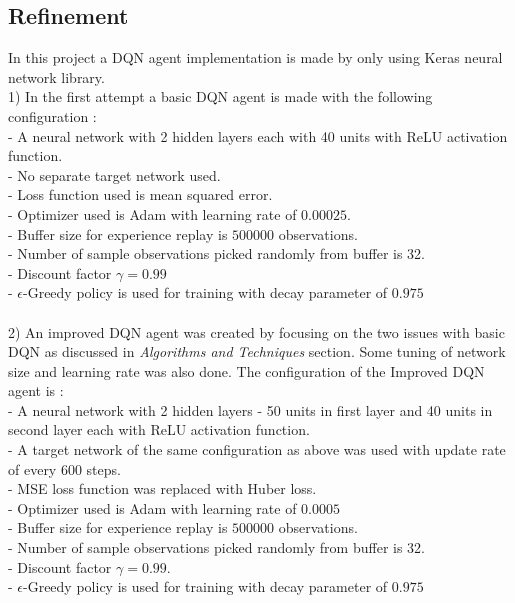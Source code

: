\documentclass{article}
\begin{document}
\subsection*{Refinement}
In this project a DQN agent implementation is made by only using Keras neural network library.\\
1) In the first attempt a basic DQN agent is made with the following configuration : \\
\indent - A neural network with 2 hidden layers each with 40 units with ReLU activation function.\\
\indent - No separate target network used.\\
\indent - Loss function used is mean squared error.\\
\indent - Optimizer used is Adam with learning rate of $0.00025$.\\
\indent - Buffer size for experience replay is $500000$ observations.\\
\indent - Number of sample observations picked randomly from buffer is 32.\\
\indent - Discount factor $\gamma = 0.99$\\
\indent - $\epsilon$-Greedy policy is used for training with decay parameter of $0.975$\\\\
2) An improved DQN agent was created by focusing on the two issues with basic DQN as discussed in \textit{Algorithms and Techniques} section. Some tuning of network size and learning rate was also done. The configuration of the Improved DQN agent is :\\
\indent - A neural network with 2 hidden layers - 50 units in first layer and 40 units in second layer each with ReLU activation function.\\
\indent - A target network of the same configuration as above was used with update rate of every $600$ steps.\\
\indent - MSE loss function was replaced with Huber loss.\\
\indent - Optimizer used is Adam with learning rate of $0.0005$\\
\indent - Buffer size for experience replay is $500000$ observations.\\
\indent - Number of sample observations picked randomly from buffer is 32.\\
\indent - Discount factor $\gamma = 0.99$.\\
\indent - $\epsilon$-Greedy policy is used for training with decay parameter of $0.975$\\
\end{document}
